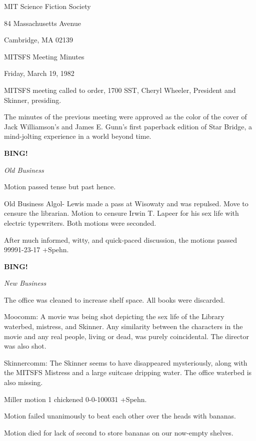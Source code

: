 \documentclass[12pt]{article}
\newcommand{\bing}{{\bf BING!} }
\newcommand{\goto}[1]{\bing \vskip 12pt \centerline{{\em{#1}}}}
\begin{document}
\begin{center}

MIT Science Fiction Society 

84 Massachusetts Avenue

Cambridge, MA 02139

\vspace{12pt}

MITSFS Meeting Minutes 

Friday, March 19, 1982

\end{center}
 
\vspace{18pt}

\setlength{\parskip}{6pt}

\noindent
MITSFS meeting called to order, 1700 SST,
Cheryl Wheeler, President and Skinner, presiding.

The minutes of the previous meeting were approved as the color of the cover of Jack Williamson's and James E. Gunn's first paperback edition of Star Bridge, a mind-jolting experience in a world beyond time.

\goto{Old Business}

Motion passed tense but past hence.

Old Business Algol- Lewis made a pass at Wisowaty and was repulsed. Move to censure the librarian. Motion to censure Irwin T. Lapeer for his sex life with electric typewriters. Both motions were seconded.

After much informed, witty, and quick-paced discussion, the motions passed 99991-23-17 +Spehn.

\goto{New Business}

The office was cleaned to increase shelf space. All books were discarded.

Moocomm: A movie was being shot depicting the sex life of the Library waterbed, mistress, and Skinner. Any similarity between the characters in the movie and any real people, living or dead, was purely coincidental. The director was also shot.

Skinnercomm: The Skinner seems to have disappeared mysteriously, along with the MITSFS Mistress and a large suitcase dripping water. The office waterbed is also missing.

Miller motion 1 chickened 0-0-100031 +Spehn.

Motion failed unanimously to beat each other over the heads with bananas.

Motion died for lack of second to store bananas on our now-empty shelves.
\end{document}
